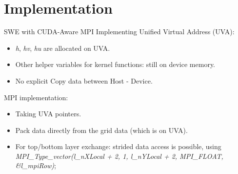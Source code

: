 \documentclass[
  english,            %
  aspectratio=169,    %
  11pt
]{tumbeamer}
\begin{document}

\section{Implementation}






\begin{frame}{SWE with CUDA-Aware MPI}
\vfill
Implementing Unified Virtual Address (UVA):
  \begin{itemize}
  	\item \textit{h}, \textit{hv}, \textit{hu} are allocated on UVA.
  	\item Other helper variables for kernel functions: still on device memory. 
  	\item No explicit Copy data between Host - Device. 
  \end{itemize}
\vfill
MPI implementation:
	\begin{itemize}
		\item Taking UVA pointers.
		\item Pack data directly from the grid data (which is on UVA).
		\item For top/bottom layer exchange: strided data access is possible, using \\
		\textit{\footnotesize MPI\_Type\_vector(l\_nXLocal + 2, 1, l\_nYLocal + 2, MPI\_FLOAT, \&l\_mpiRow)};
	\end{itemize}

\vfill
\end{frame}


    



    
    


\end{document}
